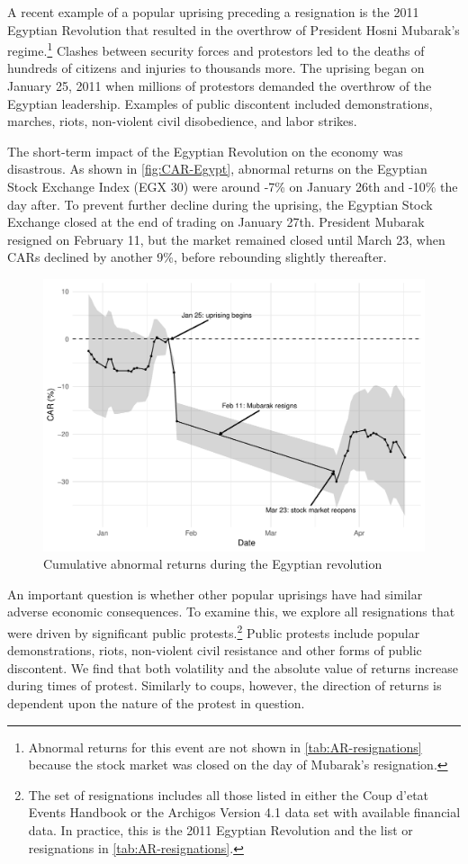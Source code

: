 \documentclass[12pt,final,fleqn]{article}
\theoremstyle{plain}
\begin{document}
A recent example of a popular uprising preceding a resignation is the 2011 Egyptian Revolution that resulted in the overthrow of President Hosni Mubarak's regime.\footnote{Abnormal returns for this event are not shown in \autoref{tab:AR-resignations} because the stock market was closed on the day of Mubarak's resignation.} Clashes between security forces and protestors led to the deaths of hundreds of citizens and injuries to thousands more. The uprising began on January 25, 2011 when millions of protestors demanded the overthrow of the Egyptian leadership. Examples of public discontent included demonstrations, marches, riots, non-violent civil disobedience, and labor strikes.

The short-term impact of the Egyptian Revolution on the economy was disastrous. As shown in \autoref{fig:CAR-Egypt}, abnormal returns on the Egyptian Stock Exchange Index (EGX 30) were around -7\% on January 26th and -10\% the day after. To prevent further decline during the uprising, the Egyptian Stock Exchange closed at the end of trading on January 27th. President Mubarak resigned on February 11, but the market remained closed until March 23, when CARs declined by another 9\%, before rebounding slightly thereafter.

\begin{figure}[!ht]
\includegraphics{../figs/egypt-revolution-2011.pdf}
\caption{Cumulative abnormal returns during the Egyptian revolution}
\label{fig:CAR-Egypt}
\end{figure}

An important question is whether other popular uprisings have had similar adverse economic consequences. To examine this, we explore all resignations that were driven by significant public protests.\footnote{The set of resignations includes all those listed in either the Coup d'etat Events Handbook or the Archigos Version 4.1 data set with available financial data. In practice, this is the 2011 Egyptian Revolution and the list or resignations in \autoref{tab:AR-resignations}.} Public protests include popular demonstrations, riots, non-violent civil resistance and other forms of public discontent. We find that both volatility and the absolute value of returns increase during times of protest. Similarly to coups, however, the direction of returns is dependent upon the nature of the protest in question. 
\end{document}
